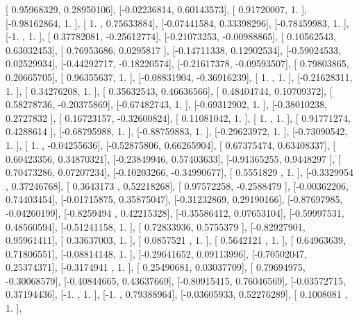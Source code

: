 \documentclass{article}
\begin{document}
       [ 0.95968329,  0.28950106],
       [-0.02236814,  0.60143573],
       [ 0.91720007,  1.        ],
       [-0.98162864,  1.        ],
       [ 1.        ,  0.75633884],
       [-0.07441584,  0.33398296],
       [-0.78459983,  1.        ],
       [-1.        ,  1.        ],
       [ 0.37782081, -0.25612774],
       [-0.21073253, -0.00988865],
       [ 0.10562543,  0.63032453],
       [ 0.76953686,  0.0295817 ],
       [-0.14711338,  0.12902534],
       [-0.59024533,  0.02529934],
       [-0.44292717, -0.18220574],
       [-0.21617378, -0.09593507],
       [ 0.79803865,  0.20665705],
       [ 0.96355637,  1.        ],
       [-0.08831904, -0.36916239],
       [ 1.        ,  1.        ],
       [-0.21628311,  1.        ],
       [ 0.34276208,  1.        ],
       [ 0.35632543,  0.46636566],
       [ 0.48404744,  0.10709372],
       [ 0.58278736, -0.20375869],
       [-0.67482743,  1.        ],
       [-0.69312902,  1.        ],
       [-0.38010238,  0.2727832 ],
       [ 0.16723157, -0.32600824],
       [ 0.11081042,  1.        ],
       [ 1.        ,  1.        ],
       [ 0.91771274,  0.4288614 ],
       [-0.68795988,  1.        ],
       [-0.88759883,  1.        ],
       [-0.29623972,  1.        ],
       [-0.73090542,  1.        ],
       [ 1.        , -0.04255636],
       [-0.52875806,  0.66265904],
       [ 0.67375474,  0.63408337],
       [ 0.60423356,  0.34870321],
       [-0.23849946,  0.57403633],
       [-0.91365255,  0.9448297 ],
       [ 0.70473286,  0.07207234],
       [-0.10203266, -0.34990677],
       [ 0.5551829 ,  1.        ],
       [-0.3329954 ,  0.37246768],
       [ 0.3643173 ,  0.52218268],
       [ 0.97572258, -0.2588479 ],
       [-0.00362206,  0.74403454],
       [-0.01715875,  0.35875047],
       [-0.31232869,  0.29190166],
       [-0.87697985, -0.04260199],
       [-0.8259494 ,  0.42215328],
       [-0.35586412,  0.07653104],
       [-0.59997531,  0.48560594],
       [-0.51241158,  1.        ],
       [ 0.72833936,  0.5755379 ],
       [-0.82927901,  0.95961411],
       [ 0.33637003,  1.        ],
       [ 0.0857521 ,  1.        ],
       [ 0.5642121 ,  1.        ],
       [ 0.64963639,  0.71806551],
       [-0.08814148,  1.        ],
       [-0.29641652,  0.09113996],
       [-0.70502047,  0.25374371],
       [-0.3174941 ,  1.        ],
       [ 0.25490681,  0.03037709],
       [ 0.79694975, -0.30068579],
       [-0.40844665,  0.43637669],
       [-0.80915415,  0.76046569],
       [-0.03572715,  0.37194436],
       [-1.        ,  1.        ],
       [-1.        ,  0.79388964],
       [-0.03605933,  0.52276289],
       [ 0.1008081 ,  1.        ],
\end{document}
